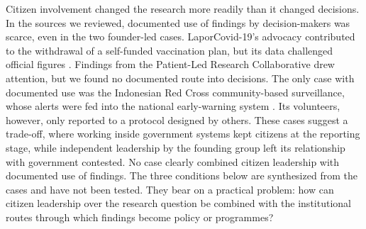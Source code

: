\documentclass[
  number,
  preprint]{elsarticle}
\begin{document}
Citizen involvement changed the research more readily than it changed
decisions. In the sources we reviewed, documented use of findings by
decision-makers was scarce, even in the two founder-led cases.
LaporCovid-19's advocacy contributed to the withdrawal of a self-funded
vaccination plan, but its data challenged official figures
\citep{laporcovid2021}. Findings from the Patient-Led Research
Collaborative drew attention, but we found no documented route into
decisions. The only case with documented use was the Indonesian Red
Cross community-based surveillance, whose alerts were fed into the
national early-warning system \citep{ifrc2021}. Its volunteers, however,
only reported to a protocol designed by others. These cases suggest a
trade-off, where working inside government systems kept citizens at the
reporting stage, while independent leadership by the founding group left
its relationship with government contested. No case clearly combined
citizen leadership with documented use of findings. The three conditions
below are synthesized from the cases and have not been tested. They bear
on a practical problem: how can citizen leadership over the research
question be combined with the institutional routes through which
findings become policy or programmes?
\end{document}
